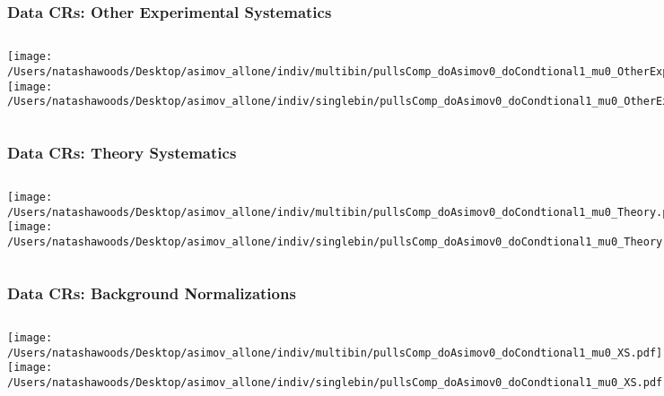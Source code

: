 \documentclass{beamer}
\begin{document}
\begin{frame}
\frametitle{Data CRs: Other Experimental Systematics}
    \begin{columns}[t]
       \texttt{[image: /Users/natashawoods/Desktop/asimov\_allone/indiv/multibin/pullsComp\_doAsimov0\_doCondtional1\_mu0\_OtherExp.pdf]}
              \texttt{[image: /Users/natashawoods/Desktop/asimov\_allone/indiv/singlebin/pullsComp\_doAsimov0\_doCondtional1\_mu0\_OtherExp.pdf]}
       \end{columns}
\end{frame}


\begin{frame}
\frametitle{Data CRs: Theory Systematics}
    \begin{columns}[t]
       \texttt{[image: /Users/natashawoods/Desktop/asimov\_allone/indiv/multibin/pullsComp\_doAsimov0\_doCondtional1\_mu0\_Theory.pdf]}
              \texttt{[image: /Users/natashawoods/Desktop/asimov\_allone/indiv/singlebin/pullsComp\_doAsimov0\_doCondtional1\_mu0\_Theory.pdf]}
       \end{columns}
\end{frame}

\begin{frame}
\frametitle{Data CRs: Background Normalizations}
    \begin{columns}[t]
       \texttt{[image: /Users/natashawoods/Desktop/asimov\_allone/indiv/multibin/pullsComp\_doAsimov0\_doCondtional1\_mu0\_XS.pdf]}
              \texttt{[image: /Users/natashawoods/Desktop/asimov\_allone/indiv/singlebin/pullsComp\_doAsimov0\_doCondtional1\_mu0\_XS.pdf]}
       \end{columns}
\end{frame}
\end{document}
